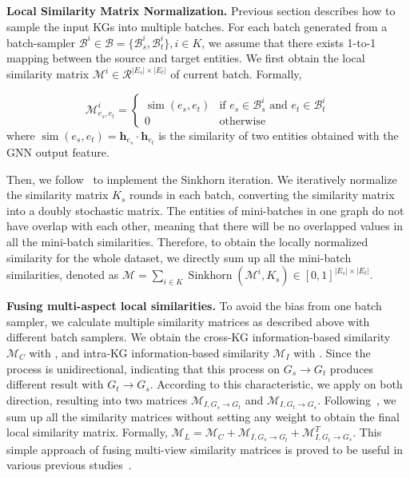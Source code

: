 \noindent
\textbf{Local Similarity Matrix Normalization.}
\label{sec:normalize-local-sim}
Previous section describes how to sample the input KGs into multiple batches. For each batch generated from a batch-sampler $\mathcal{B}^i \in \mathcal{B} = \{\mathcal{B}^i_s, \mathcal{B}^i_t\}, i \in K$,  we assume that there exists 1-to-1 mapping between the source and target entities. We first obtain the local similarity matrix $\mathcal{M}^i\in \mathcal{R}^{|E_s|\times|E_t|}$ of current batch.
Formally,

\vspace{-2mm}
\begin{equation}
   \mathcal{M}^i_{e_s, e_t}  =
    \begin{cases}
      \operatorname{sim}(e_s, e_t) & \text{if $e_s \in \mathcal{B}^i_s$ and $e_t \in \mathcal{B}^i_t$}\\
      0 & \text{otherwise}
    \end{cases}
\end{equation}
where $\operatorname{sim}(e_{s}, e_{t})= \mathbf{h}_{e_s} \cdot \mathbf{h}_{e_t}$ is the similarity of two entities obtained with the GNN output feature.

Then, we follow~\cite{Sinkhorn13} to implement the Sinkhorn iteration. We iteratively normalize the similarity matrix $K_s$ rounds in each batch, converting the similarity matrix into a doubly stochastic matrix.
The entities of mini-batches in one graph do not have overlap with each other, meaning that there will be no overlapped values in all the mini-batch similarities. Therefore, to obtain the locally normalized similarity for the whole dataset, we directly sum up all the mini-batch similarities, denoted as $\mathcal{M} = \sum_{i \in K} \operatorname{Sinkhorn} (\mathcal{M}^i, K_s) \in [0,1] ^{|E_s|\times|E_t|}$.

\noindent
\textbf{Fusing multi-aspect local similarities.}
To avoid the bias from one batch sampler, we calculate multiple similarity matrices as described above with different batch samplers. We obtain the cross-KG information-based similarity $\mathcal{M}_C$ with \KMeans{}, and intra-KG information-based similarity $\mathcal{M}_I$ with \MetisGCN{}.
Since the \MetisGCN{} process is unidirectional, indicating that this process on $G_s \rightarrow G_t$ produces different result with $G_t \rightarrow G_s$. According to this characteristic, we apply \MetisGCN{} on both direction, resulting into two matrices $\mathcal{M}_{I, G_s\rightarrow G_t}$ and $\mathcal{M}_{I, G_t\rightarrow G_s}$. Following~\cite{CEAFF20}, we sum up all the similarity matrices without setting any weight to obtain the final local similarity matrix. Formally, $ \mathcal{M}_{L} = \mathcal{M}_C + \mathcal{M}_{I, G_s\rightarrow G_t}+ \mathcal{M}_{I, G_t\rightarrow G_s}^T$.
This simple approach of fusing multi-view similarity matrices is proved to be useful in various previous studies~\cite{CEAFF20, CEAFF21, EASY21, LargeEA22}.

